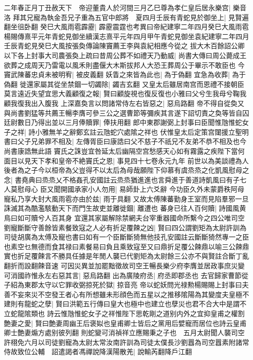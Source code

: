 二年春正月丁丑赦天下　帝迎董貴人於河間三月乙巳尊為孝仁皇后居永樂宫|{
	樂音洛}
拜其兄寵為執金吾兄子重為五官中郎將　夏四月壬辰有青蛇見於御坐上|{
	見賢遍翻坐徂卧翻}
癸巳大風雨雹霹靂|{
	霹靂震霆也考異曰帝紀建寧二年四月癸巳大風雨雹楊賜傳熹平元年青蛇見御坐續漢志熹平元年四月甲午青蛇見御坐袁紀建寧二年四月壬辰青蛇見癸巳大風按張奐傳論陳竇薦王李與袁紀相應今從之}
拔大木百餘詔公卿以下各上封事大司農張奐上疏曰昔周公葬不如禮天乃動威|{
	尚書大傳曰周公薨成王欲葬之成周天乃雷電以風禾則盡偃大木斯拔邦人大恐王葬周公于畢示不敢臣也}
今竇武陳蕃忠貞未被明宥|{
	被皮義翻}
妖眚之來皆為此也|{
	為于偽翻}
宜急為收葬|{
	為于偽翻}
徙還家屬其從坐禁錮一切蠲除|{
	蠲吉玄翻}
又皇太后雖居南宫而恩禮不接朝臣莫言遠近失望宜思大義顧復之報|{
	賢曰顧旋視也復反復也小雅曰父兮生我母兮鞠我顧我復我出入腹我}
上深嘉奐言以問諸常侍左右皆惡之|{
	惡烏路翻}
帝不得自從奐又與尚書劉猛等共薦王暢李膺可參三公之選曹節等彌疾其言遂下詔切責之奐等皆自囚廷尉數日乃得出並以三月俸贖罪|{
	俸扶用翻}
郎中東郡謝弼上封事曰臣聞惟虺惟蛇女子之祥|{
	詩小雅無羊之辭鄭玄註云虺蛇穴處隂之祥也}
伏惟皇太后定策宫闥援立聖明書曰父子兄弟罪不相及|{
	左傳胥臣曰康誥曰父不慈子不祇兄不友弟不恭不相及也今尚書康誥無此語}
竇氏之誅豈宜咎延太后幽隔空宫愁感天心如有霧露之疾陛下當何面目以見天下孝和皇帝不絶竇氏之恩|{
	事見四十七卷永元九年}
前世以為美談禮為人後者為之子今以桓帝為父豈得不以太后為母哉願陛下仰慕有虞烝烝之化凱風慰母之念|{
	書堯典曰烝烝乂不格姦孔安國註云烝烝猶進進也言舜進于善道詩凱風曰有子七人莫慰母心}
臣又聞開國承家小人勿用|{
	易師卦上六爻辭}
今功臣久外未蒙爵秩阿母寵私乃享大封大風雨雹亦由於兹|{
	雨于具翻}
又故太傅陳蕃勤身王室而見陷羣邪一旦誅滅其為酷濫駭動天下而門生故吏並離徙錮|{
	離遭也}
蕃身已往人百何贖|{
	詩國風黄鳥曰如可贖兮人百其身}
宜還其家屬解除禁網夫台宰重器國命所繫今之四公唯司空劉寵斷斷守善餘皆素餐致寇之人必有折足覆餗之凶|{
	賢曰四公謂劉矩為太尉許訓為司徒胡廣為太傅及寵也書曰如有一个臣斷斷猗無他技孔安國註云斷斷猗然專一之臣也素空乜無德而食其禄曰素餐易曰負且乘致寇至又曰鼎折足覆公餗鼎以喻三公餗鼎實也折足覆餗言不勝具任據是年閒人襲已代劉矩為太尉餘三公亦不與賢註合斷丁亂翻折而設翻餗音速}
可因災異並加罷黜徵故司空王暢長樂少府李膺並居政事庶災變可消國祚惟永左右惡其言|{
	惡烏路翻}
出為廣陵府丞|{
	府丞即郡丞也}
去官歸家曹節從子紹為東郡太守以它罪收弼掠死於獄|{
	掠音亮}
帝以蛇妖問光禄勲楊賜賜上封事曰夫善不妄來災不空發王者心有所想雖未形顔色而五星以之推移隂陽為其變度夫皇極不建則有龍蛇之孽|{
	賢曰洪範五行傳曰皇大也極中也建立也孽災也君不合大中是謂不立蛇龍隂類也}
詩云惟虺惟蛇女子之祥惟陛下思乾剛之道别内外之宜抑皇甫之權割艶妻之愛|{
	賢曰艶妻周幽王后褒姒也皇甫卿士皆后之黨用后嬖寵而居位也詩云皇甫卿士艶妻煽方處别彼列翻}
則蛇變可消禎祥立應賜秉之子也　五月太尉聞人襲司空許栩免六月以司徒劉寵為太尉太常汝南許訓為司徒太僕長沙劉囂為司空囂素附諸常侍故致位公輔　詔遣謁者馮禪說降漢陽散羌|{
	說輸芮翻降戶江翻}
